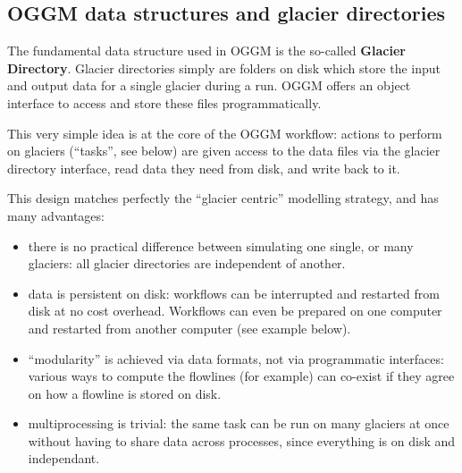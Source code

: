\subsection{OGGM data structures and glacier directories}

The fundamental data structure used in OGGM is the so-called \textbf{Glacier Directory}. Glacier directories simply are
folders on disk which store the input and output data for a single glacier during a run. OGGM offers an object interface
to access and store these files programmatically.

This very simple idea is at the core of the OGGM workflow: actions to perform on glaciers (“tasks”, see below) are given
access to the data files via the glacier directory interface, read data they need from disk, and write back to it.

This design matches perfectly the “glacier centric” modelling strategy, and has many advantages:
\begin{itemize}[nosep]
\item {} 
there is no practical difference between simulating one single, or many glaciers: all glacier directories are
independent of another.

\item {} 
data is persistent on disk: workflows can be interrupted and restarted from disk at no cost overhead. Workflows can
even be prepared on one computer and restarted from another computer (see example below).

\item {} 
“modularity” is achieved via data formats, not via programmatic interfaces: various ways to compute the flowlines (for
example) can co-exist if they agree on how a flowline is stored on disk.

\item {} 
multiprocessing is trivial: the same task can be run on many glaciers at once without having to share data across
processes, since everything is on disk and independant.

\end{itemize}

